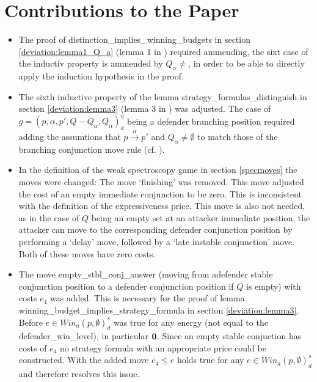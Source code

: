 \section{Contributions to the Paper}
\begin{itemize}
    \item The proof of distinction\_implies\_winning\_budgets in section \ref{deviation:lemma1_Q_a} 
    (lemma 1 in \cite{bisping2023lineartimebranchingtime}) required ammending, the sixt case
    of the inductiv property is ammended by $Q_\alpha \neq {}$, in order to be able to directly
    apply the induction hypothesis in the proof.

    \item The sixth inductive property of the lemma strategy\_formulas\_distinguish in section \ref{deviation:lemma3} 
    (lemma 3 in \cite{bisping2023lineartimebranchingtime}) was adjusted.
    The case of $g=(p,\alpha ,p', Q- Q_\alpha, Q_\alpha)_d^\eta$ being a defender branching position
    required adding the assumtions that $p \overset{\alpha}{\longrightarrow} p'$ and $Q_\alpha \neq \emptyset$
    to match those of the branching conjunction move rule (cf. \cite[p. 13]{bisping2023lineartimebranchingtime}). 

    \item In the definition of the weak spectroscopy game in section \ref{specmoves} the moves were changed: 
    The move `finishing' was removed. This move adjusted the cost of an empty immediate conjunction to be zero.
    This is inconsistent with the definition of the expressiveness price. This move is also not needed, as in the case of $Q$ being an empty set at an attacker immediate position, the attacker can move to the corresponding
    defender conjunction position by performing a `delay' move, followed by a `late instable conjunction' move. Both of these moves have zero costs.

    \item The move empty\_stbl\_conj\_answer (moving from adefender stable conjunction position to a defender conjunction
    position if $Q$ is empty) with costs $e_4$ was added. This is necessary for the proof of lemma 
    winning\_budget\_implies\_strategy\_formula in section \ref{deviation:lemma3}. Before 
    $e \in Win_a (p, \emptyset)_d^s $ was true for any energy (not equal to the defender\_win\_level), in particular $\bold{0}$. 
    Since an empty stable conjuction has costs of $e_4$ no strategy formula with an appropriate price could be constructed. 
    With the added move $e_4 \leq e $ holds true for any $e \in Win_a (p, \emptyset)_d^s $ and therefore resolves this issue.


\end{itemize}
